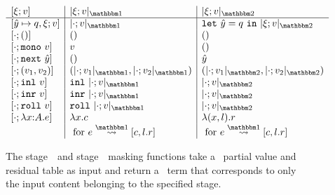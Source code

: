 %

\begin{figure}
\[\begin{array}{l|l|l}
[\xi;v] & \masko{\xi;v} & \maskt{\xi;v} \\ \hline
[\hat y \mapsto q,\xi;v]
  & \masko{\cdot;v}
  & \letin {\hat y} q {\maskt{\xi;v}} \\\relax
[\cdot;()] 
  & ()
  & () \\\relax
[\cdot;\monoTerm~v] 
  & v
  & () \\\relax
[\cdot;\next~\hat y] 
  & ()
  & \hat y \\\relax
[\cdot;(v_1,v_2)] 
  & (\masko {\cdot;v_1},\masko {\cdot;v_2})
  & (\maskt {\cdot;v_1},\maskt {\cdot;v_2}) \\\relax
[\cdot;\inl~v] 
  & \inl~\masko{\cdot;v}
  & \maskt {\cdot;v} \\\relax
[\cdot;\inr~v] 
  & \inr~\masko{\cdot;v}
  & \maskt {\cdot;v} \\\relax
[\cdot;\roll~v] 
  & \roll~\masko{\cdot;v}
  & \maskt {\cdot;v} \\\relax
[\cdot;\lam xAe]
  & \lambda x.c 
  & \lambda (x,l).r \\
& \text{ for } \splitone e A {c,l.r}
& \text{ for } \splitone e A {c,l.r}
\end{array}\]

\caption{The stage~\bbone\ and stage~\bbtwo\ masking functions take a \lang\ partial value and residual table as input
and return a \langmono\ term that corresponds to only the input content belonging to the specified stage.}
\label{fig:valMask}
\end{figure}

